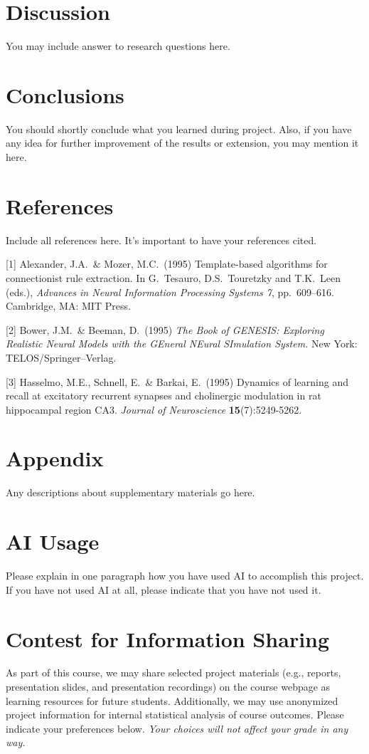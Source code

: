 \documentclass{article}
\begin{document}
\section{Discussion}
You may include answer to research questions here.
	

\section{Conclusions}
You should shortly conclude what you learned during project. Also, if you have any idea for further improvement of the results or extension, you may mention it here.
	
	


\section*{References}
Include all references here. It’s important to have your references cited.
\medskip
{
\small


[1] Alexander, J.A.\ \& Mozer, M.C.\ (1995) Template-based algorithms for
connectionist rule extraction. In G.\ Tesauro, D.S.\ Touretzky and T.K.\ Leen
(eds.), {\it Advances in Neural Information Processing Systems 7},
pp.\ 609--616. Cambridge, MA: MIT Press.


[2] Bower, J.M.\ \& Beeman, D.\ (1995) {\it The Book of GENESIS: Exploring
  Realistic Neural Models with the GEneral NEural SImulation System.}  New York:
TELOS/Springer--Verlag.


[3] Hasselmo, M.E., Schnell, E.\ \& Barkai, E.\ (1995) Dynamics of learning and
recall at excitatory recurrent synapses and cholinergic modulation in rat
hippocampal region CA3. {\it Journal of Neuroscience} {\bf 15}(7):5249-5262.
}

\section*{Appendix}
Any descriptions about supplementary materials go here.


\newpage
\section*{AI Usage}
Please explain in one paragraph how you have used AI to accomplish this project. If you have not used AI at all, please indicate that you have not used it. 

\section*{Contest for Information Sharing}
As part of this course, we may share selected project materials (e.g., reports, presentation slides, and presentation recordings) on the course webpage as learning resources for future students. Additionally, we may use anonymized project information for internal statistical analysis of course outcomes. Please indicate your preferences below. \textit{Your choices will not affect your grade in any way.}
\end{document}
